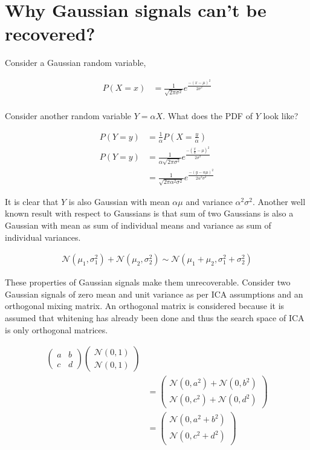 \documentclass[11pt, a4paper]{article}
\begin{document}
\section{Why Gaussian signals can't be recovered?}

Consider a Gaussian random variable,

\begin{align*}
	P(X=x) & = \frac{1}{\sqrt{2\pi\sigma^2}} e^{\frac{-(x-\mu)^2}{2\sigma^2}} \\
\end{align*}

Consider another random variable $Y=\alpha X$. What does the PDF of $Y$ look like? 

\begin{align*}
	P(Y=y) & = \frac{1}{\alpha} P(X=\frac{y}{\alpha})                                                     \\
	P(Y=y) & = \frac{1}{\alpha \sqrt{2\pi\sigma^2}} e^{\frac{-(\frac{y}{\alpha}-\mu)^2}{2\sigma^2}}       \\
	       & = \frac{1}{\sqrt{2\pi \alpha^2 \sigma^2}} e^{\frac{-(y- \alpha \mu)^2}{2 \alpha^2 \sigma^2}} 
\end{align*}

It is clear that $Y$ is also Gaussian with mean $\alpha \mu$ and variance $\alpha^2 \sigma^2$. Another well known result with respect to Gaussians is that sum of two Gaussians is also a Gaussian with mean as sum of individual means and variance as sum of individual variances.

\begin{align*}
	\mathcal{N}(\mu_1, \sigma_1^2) + \mathcal{N}(\mu_2, \sigma_2^2) \sim \mathcal{N}(\mu_1 + \mu_2, \sigma_1^2 + \sigma_2^2) 
\end{align*}

These properties of Gaussian signals make them unrecoverable. Consider two Gaussian signals of zero mean and unit variance as per ICA assumptions and an orthogonal mixing matrix. An orthogonal matrix is considered because it is assumed that whitening has already been done and thus the search space of ICA is only orthogonal matrices.

\begin{align*} 
	\begin{pmatrix} 
	a & b                 \\ 
	c & d                 
	\end{pmatrix}
	\begin{pmatrix} 
	\mathcal{N}(0, 1) \\ 
	\mathcal{N}(0, 1) 
	\end{pmatrix} \\
	  & = \begin{pmatrix} 
	\mathcal{N}(0, a^2) + \mathcal{N}(0, b^2) \\ 
	\mathcal{N}(0, c^2) + \mathcal{N}(0, d^2)
	\end{pmatrix}  \\
	  & = \begin{pmatrix} 
	\mathcal{N}(0, a^2+b^2)  \\ 
	\mathcal{N}(0, c^2 + d^2)
	\end{pmatrix}
\end{align*}
\end{document}

